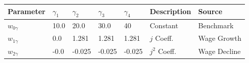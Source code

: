 \small\begin{tabular}{l l l l l l l} 
\hline 
 Parameter & $\gamma_1$ &  $\gamma_2$ & $\gamma_3$ & $\gamma_4$ & Description & Source \\ 
\hline 
$w_{0\gamma}$ & 10.0 & 20.0 
               & 30.0 & 40 
               & Constant & Benchmark \\ 
$w_{1\gamma}$ & 0.0 &  1.281 
               & 1.281 & 1.281 
               & $j$ Coeff. & Wage Growth \\ 
$w_{2\gamma}$ & -0.0 &  -0.025 
               & -0.025 & -0.025 
               & $j^{2}$ Coeff. & Wage Decline \\ 
\hline 
\end{tabular}
